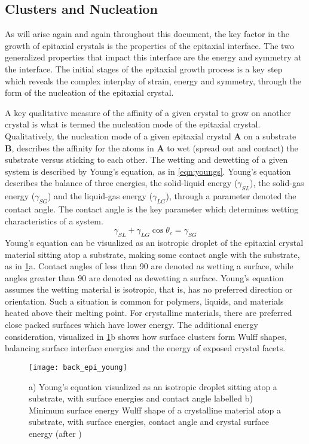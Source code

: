 \subsection{Clusters and Nucleation}
As will arise again and again throughout this document, the key factor in the growth of epitaxial crystals is the properties of the epitaxial interface. The two generalized properties that impact this interface are the energy and symmetry at the interface. The initial stages of the epitaxial growth process is a key step which reveals the complex interplay of strain, energy and symmetry, through the form of the nucleation of the epitaxial crystal.

A key qualitative measure of the affinity of a given crystal to grow on another crystal is what is termed the nucleation mode of the epitaxial crystal. Qualitatively, the nucleation mode of a given epitaxial crystal \textbf{A} on a substrate \textbf{B}, describes the affinity for the atoms in \textbf{A} to wet (spread out and contact) the substrate versus sticking to each other. The wetting and dewetting of a given system is described by Young's equation, as in \cref{eqn:youngs}. Young's equation describes the balance of three energies, the solid-liquid energy (\(\gamma_{SL}\)), the solid-gas energy (\(\gamma_{SG}\)) and the liquid-gas energy (\(\gamma_{LG}\)), through a parameter denoted the contact angle. The contact angle is the key parameter which determines wetting characteristics of a system.
\begin{equation}
\gamma_{SL} + \gamma_{LG} \cos{\theta_c} = \gamma_{SG} \label{eqn:youngs}
\end{equation}
Young's equation can be visualized as an isotropic droplet of the epitaxial crystal material sitting atop a substrate, making some contact angle with the substrate, as in \cref{fig:back_epi_young}a. Contact angles of less than 90\degree{} are denoted as wetting a surface, while angles greater than 90\degree{} are denoted as dewetting a surface. Young's equation assumes the wetting material is isotropic, that is, has no preferred direction or orientation. Such a situation is common for polymers, liquids, and materials heated above their melting point. For crystalline materials, there are preferred close packed surfaces which have lower energy. The additional energy consideration, visualized in \cref{fig:back_epi_young}b shows how surface clusters form Wulff shapes, balancing surface interface energies and the energy of exposed crystal facets\cite{Venables1984}.
\begin{figure}
    \centering
    \texttt{[image: back\_epi\_young]}
    \caption[Young's equation]{\label{fig:back_epi_young}a) Young's equation visualized as an isotropic droplet sitting atop a substrate, with surface energies and contact angle labelled b) Minimum surface energy Wulff shape of a crystalline material atop a substrate, with surface energies, contact angle and crystal surface energy (after \cite{wikipedia_surface_energy})}
\end{figure}

